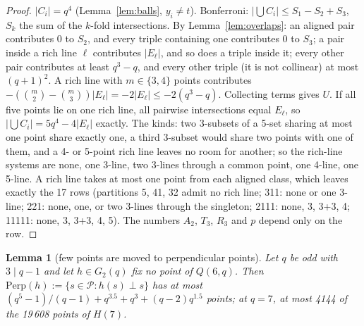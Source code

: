 \documentclass[11pt]{amsart}
\newtheorem{lemma}[theorem]{Lemma}
\theoremstyle{definition}
\theoremstyle{remark}
\numberwithin{equation}{section}
\newcommand{\cP}{\mathcal P}
\begin{document}
\begin{proof}
$|C_i|=q^4$ (Lemma~\ref{lem:balls}, $y_i\ne t$). Bonferroni: $|\bigcup C_i|\le S_1-S_2+S_3$, $S_k$ the sum of the $k$-fold
intersections. By Lemma~\ref{lem:overlaps}: an aligned pair contributes 0 to $S_2$, and every triple containing one
contributes 0 to $S_3$; a pair inside a rich line $\ell$ contributes $|E_\ell|$, and so does a triple inside it; every other
pair contributes at least $q^3-q$, and every other triple (it is not collinear) at most $(q+1)^2$. A rich line with $m\in\{3,4\}$
points contributes $-(\binom m2-\binom m3)|E_\ell|=-2|E_\ell|\le-2(q^3-q)$. Collecting terms gives $U$. If all five points lie on
one rich line, all pairwise intersections equal $E_\ell$, so $|\bigcup C_i|=5q^4-4|E_\ell|$ exactly. The kinds: two 3-subsets of
a 5-set sharing at most one point share exactly one, a third 3-subset would share two points with one of them, and a 4- or
5-point rich line leaves no room for another; so the rich-line systems are none, one 3-line, two 3-lines through a common
point, one 4-line, one 5-line. A rich line takes at most one point from each aligned class, which leaves exactly the 17 rows
(partitions 5, 41, 32 admit no rich line; 311: none or one 3-line; 221: none, one, or two 3-lines through the singleton; 2111:
none, 3, 3+3, 4; 11111: none, 3, 3+3, 4, 5). The numbers $A_2$, $T_3$, $R_3$ and $p$ depend only on the row.
\end{proof}

\begin{lemma}[few points are moved to perpendicular points]\label{lem:perp}
Let $q$ be odd with $3\mid q-1$ and let $h\in G_2(q)$ fix no point of $Q(6,q)$. Then $\mathrm{Perp}(h):=\{s\in\cP:h(s)\perp s\}$
has at most $(q^5-1)/(q-1)+q^{3.5}+q^3+(q-2)q^{1.5}$ points; at $q=7$, at most 4144 of the 19\,608 points of $H(7)$.
\end{lemma}
\end{document}
